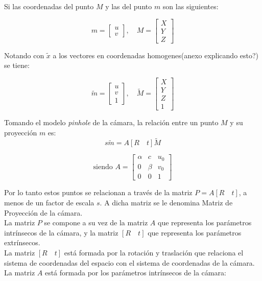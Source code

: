 Si las coordenadas del punto  $M$ y las del punto $m$ son las siguientes:


\[m = \begin{bmatrix}
u \\ 
v
\end{bmatrix} , \quad
M = \begin{bmatrix}
X \\ 
Y \\
Z
\end{bmatrix} \]

Notando con $\tilde{x}$ a los vectores en coordenadas homogenes(anexo explicando esto?) se tiene:

\[\tilde{m} = \begin{bmatrix}
u \\ 
v \\
1
\end{bmatrix} , \quad
\tilde{M} = \begin{bmatrix}
X \\ 
Y \\
Z \\
1
\end{bmatrix} \]

Tomando el modelo \textit{pinhole} de la cámara, la relación entre un punto $M$ y su proyección $m$ es:
\begin{equation}
s\tilde{m} = A [R \quad t]\tilde{M}
\label{proyeccion}
\end{equation}




\begin{equation}
\text{siendo }
A = \begin{bmatrix}
\alpha & c & u_0 \\ 
0 & \beta & v_0 \\ 
0 & 0 & 1
\end{bmatrix} 
\end{equation}

Por lo tanto estos puntos se relacionan a través de la matriz $P = A [R \quad t]$, a menos de un factor de escala $s$. A dicha matriz  se le denomina Matriz de Proyección de la cámara.\\

La matriz $P$ se compone a su vez de la matriz $A$ que representa los parámetros intrínsecos de la cámara, y la matriz $[R \quad t]$ que representa los parámetros extrínsecos.\\

La matriz $[R \quad t]$ está formada por la rotación y traslación que relaciona el sistema de coordenadas del espacio con el sistema de coordenadas de la cámara. La matriz $A$ está formada por los parámetros intrínsecos de la cámara:\\



